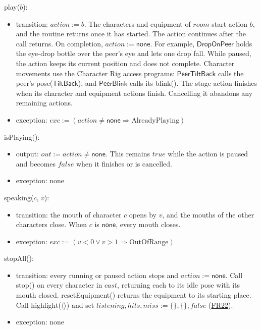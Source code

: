 \documentclass[10pt, titlepage]{article}
\newcommand{\srsurl}{https://team-hindsight.github.io/ophthamology-game/SRS/SRS.pdf}
\newcommand{\srsitemref}[2]{\href{\srsurl\#nameddest=#1}{#2}}
\newcommand{\T}[1]{\mathit{#1}}          %
\newcommand{\V}[1]{\mathsf{#1}}          %
\newcommand{\out}{\mathit{out}}
\newcommand{\exc}{\mathit{exc}}
\newcommand{\true}{\mathit{true}}
\newcommand{\false}{\mathit{false}}
\begin{document}
\begin{samepage}
\noindent play($b$):
\begin{itemize}
\item transition: $\T{action} := b$. The characters and equipment of
  $\T{room}$ start action $b$, and the routine returns once it has started.
  The action continues after the call returns. On completion,
  $\T{action} := \V{none}$. For example,
  $\V{DropOnPeer}$ holds the eye-drop bottle over the peer's eye and lets one
  drop fall. While paused, the action keeps its current position and does
  not complete.
  Character movements use the Character Rig access programs:
  $\V{PeerTiltBack}$ calls the peer's pose($\V{TiltBack}$), and
  $\V{PeerBlink}$ calls its blink(). The stage action finishes when its
  character and equipment actions finish. Cancelling it abandons any
  remaining actions.
\item exception: $\exc := (\T{action} \neq \V{none} \Rightarrow
  \text{AlreadyPlaying})$
\end{itemize}
\end{samepage}
\par\pagebreak[0]

\begin{samepage}
\noindent isPlaying():
\begin{itemize}
\item output: $\out := \T{action} \neq \V{none}$. This remains $\true$
  while the action is paused and becomes $\false$ when it finishes or is
  cancelled.
\item exception: none
\end{itemize}
\end{samepage}
\par\pagebreak[0]

\begin{samepage}
\noindent speaking($c$, $v$):
\begin{itemize}
\item transition: the mouth of character $c$ opens by $v$, and the mouths of
  the other characters close. When $c$ is $\V{none}$, every mouth closes.
\item exception: $\exc := (v < 0 \vee v > 1 \Rightarrow \text{OutOfRange})$
\end{itemize}
\end{samepage}
\par\pagebreak[0]

\begin{samepage}
\noindent stopAll():
\begin{itemize}
\item transition: every running or paused action stops and
  $\T{action} := \V{none}$. Call stop() on every character in $\T{cast}$,
  returning each to its idle pose with its mouth closed.
  resetEquipment() returns the equipment
  to its starting place. Call highlight($\langle\rangle$) and set
  $\T{listening}, \T{hits}, \T{miss} := \{\}, \{\}, \false$
  (\srsitemref{FR_StopOnExit}{FR22}).
\item exception: none
\end{itemize}
\end{samepage}
\par\pagebreak[0]
\end{document}
